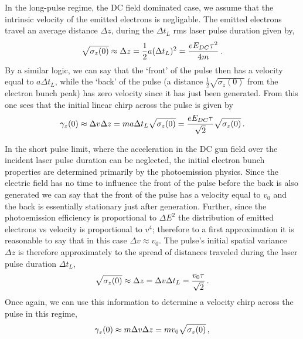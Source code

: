 In the long-pulse regime, the DC field dominated case, we assume that the intrinsic velocity of the emitted electrons is negligable.
The emitted electrons travel an average distance $ \Delta z $, during the $ \Delta t_{ L } $ rms laser pulse duration given by,
\begin{equation}
  \sqrt{ \sigma_{ z } ( 0 ) } \approx \Delta z = \frac{ 1 }{ 2 } a ( \Delta t_{L} )^{ 2 }  = \frac{ e E_{ DC } \tau^{ 2 } }{ 4 m } \, \text{.}
\end{equation}
By a similar logic, we can say that the `front' of the pulse then has a velocity equal to $ a \Delta t_{ L } $, while the `back' of the pulse (a distance $ \frac{ 1 }{ 2 } \sqrt{ \sigma_{ z } ( 0 ) } $ from the electron bunch peak) has zero velocity since it has just been generated. From this one sees that the initial linear chirp across the pulse is given by 
\begin{equation}
  \gamma_{ z } ( 0 ) \approx \Delta v \Delta z = m a \Delta t_{ L } \sqrt{ \sigma_{ z } ( 0 ) } = \frac{ e E_{ DC } \tau }{ \sqrt{ 2 } }\sqrt{ \sigma_{ z } ( 0 ) } \, \text{.}
\end{equation} 

In the short pulse limit, where the acceleration in the DC gun field over the incident laser pulse duration can be neglected, the initial electron bunch properties are determined primarily by the photoemission physics.
Since the electric field has no time to influence the front of the pulse before the back is also generated we can say that the front of the pulse has a velocity equal to $v_0$ and the back is essentially stationary just after generation.
Further, since the photoemission efficiency is proportional to $\Delta E^2$ \cite{shalaev_electron_1994} the distribution of emitted electrons vs velocity is proportional to $v^4$; therefore to a first approximation it is reasonable to say that in this case $\Delta v \approx v_0$.
The pulse's initial spatial variance $\Delta z$ is therefore approximately to the spread of distances traveled during the laser pulse duration $\Delta t_L$,
\begin{equation} 
  \sqrt{ \sigma_{ z } ( 0 ) } \approx \Delta z = \Delta v \Delta t_{L} = \frac{ v_{ 0 } \tau }{ \sqrt{ 2 } } \, \text{.}
\end{equation}
Once again, we can use this information to determine a velocity chirp across the pulse in this regime,
\begin{equation}
  \gamma_{ z } ( 0 ) \approx m \Delta v \Delta z = m v_{ 0 } \sqrt{ \sigma_{ z } ( 0 ) } \, \text{,}
\end{equation}

